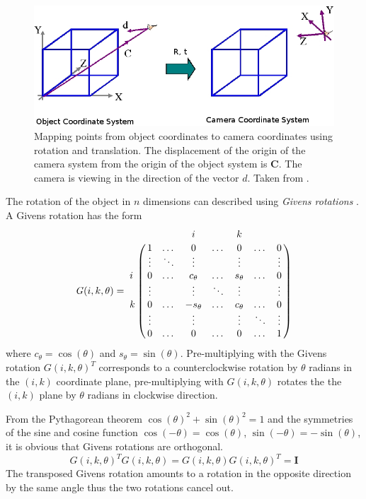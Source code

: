 \documentclass[11pt,a4paper,twoside]{report}
\begin{document}
\begin{figure}[H] 
\centering
\includegraphics[scale=0.55]{images/camera_object5.png}
\caption{ Mapping points from object coordinates to camera coordinates using
  rotation and translation. The displacement of the origin of the camera system
  from the origin of the object system is $\mathbf{C}$. The camera is viewing in
the direction of the vector $d$. Taken from \cite{graphics}.}
\label{fg:objCam}
\end{figure}

The rotation of the object in $n$ dimensions can described using
\textit{Givens rotations} \cite{matrix}. A Givens rotation has the form
\begin{equation}\label{eq:givens}
\mathit{G}(i,k,\theta) = 
\bordermatrix{
&&&i&&k& \cr
&1&\dotso&0&\dotso&0&\dotso&0 \cr
&\vdots&\ddots&\vdots&&\vdots&&\vdots \cr
i&0&\dotso&c_\theta&\dotso&s_\theta&\dotso&0 \cr
&\vdots&&\vdots&\ddots&\vdots&&\vdots \cr
k&0&\dotso&-s_\theta&\dotso&c_\theta&\dotso&0 \cr
&\vdots&&\vdots&&\vdots&\ddots&\vdots \cr
&0&\dotso&0&\dotso&0&\dotso&1 \cr
}
\end{equation}
where $c_\theta = \cos(\theta)$ and $s_\theta = \sin(\theta)$. Pre-multiplying with the Givens
rotation $\mathit{G}(i,k,\theta)^T$ corresponds to a counterclockwise rotation
by $\theta$ radians in the $(i,k)$ coordinate plane, pre-multiplying with
$\mathit{G}(i,k,\theta)$ rotates the the $(i,k)$ plane by $\theta$ radians in
clockwise direction.

From the Pythagorean theorem $\cos(\theta)^2 + \sin(\theta)^2 = 1$ and the symmetries of the sine and cosine function $\cos(-\theta) =
\cos(\theta)$, $\sin(-\theta) = -\sin(\theta)$, it is obvious that Givens rotations are
orthogonal.
\begin{equation}
\mathit{G}(i,k,\theta)^T\mathit{G}(i,k,\theta) =
\mathit{G}(i,k,\theta)\mathit{G}(i,k,\theta)^T = \mathbf{I}
\end{equation}
The transposed Givens rotation amounts to a rotation in the opposite direction by
the same angle thus the two rotations cancel out.
\end{document}
